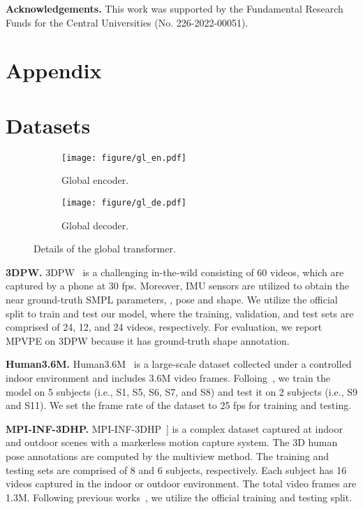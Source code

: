 \documentclass[10pt,twocolumn,letterpaper]{article}
\begin{document}
\noindent\textbf{Acknowledgements.} This work was supported by the Fundamental Research Funds for the Central Universities (No. 226-2022-00051).

		
		
		
		
		
		
{\small
			
			
		}
		\clearpage{}\section{
		Appendix
	}
\appendix
\section{Datasets}
	\begin{figure}[!t]
		\begin{subfigure}{0.48\linewidth}
			\texttt{[image: figure/gl\_en.pdf]}
\caption{Global encoder.}
\end{subfigure}
		\hfill
		\begin{subfigure}{0.48\linewidth}
			\texttt{[image: figure/gl\_de.pdf]}
\caption{Global decoder.}
\end{subfigure}
\caption{Details of the global transformer.}
		\vspace{-1.5 em}
		\label{fig:global_transformer}
	\end{figure}
	
	\noindent\textbf{3DPW.}
	3DPW~\cite{3DPW} is a challenging in-the-wild consisting of 60 videos, which are captured by a phone at 30 fps. Moreover, IMU sensors are utilized to obtain the near ground-truth SMPL parameters, \ie, pose and shape. We utilize the official split to train and test our model, where the training, validation, and test sets are comprised of 24, 12, and 24 videos, respectively. For evaluation, we report MPVPE on 3DPW because it has ground-truth shape annotation.

	\noindent\textbf{Human3.6M.}
	Human3.6M~\cite{H36M} is a large-scale dataset collected under a controlled indoor environment and includes 3.6M video frames. Folloing~\cite{TCMR,MPS-net}, we train the model on 5 subjects (i.e., S1, S5, S6, S7, and S8) and test it on 2 subjects (i.e., S9 and S11). We set the frame rate of the dataset to 25 fps for training and testing.
	
	\noindent\textbf{MPI-INF-3DHP.}
    MPI-INF-3DHP~\cite{MPII3D}] is a complex dataset captured at indoor and outdoor scenes with a markerless motion capture system. The 3D human pose annotations are computed by the multiview method.
    The training and testing sets are comprised of 8 and 6 subjects, respectively. Each subject has 16 videos captured in the indoor or outdoor environment. The total video frames are 1.3M.
    Following previous works~\cite{TCMR, MPS-net}, we utilize the official training and testing split. 
\end{document}
